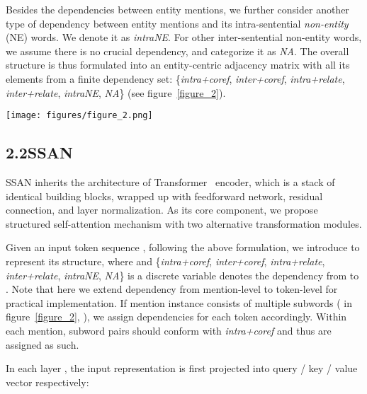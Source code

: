 \documentclass[letterpaper]{article} \usepackage{aaai21}  \usepackage{times}  \usepackage{helvet} \usepackage{courier}  \usepackage[hyphens]{url}  \usepackage{graphicx} \usepackage{booktabs}
\begin{document}
Besides the dependencies between entity mentions, we further consider another type of dependency between entity mentions and its intra-sentential \textit{non-entity} (NE) words. We denote it as \textit{intraNE}.
For other inter-sentential non-entity words, we assume there is no crucial dependency, and categorize it as \textit{NA}.
The overall structure is thus formulated into an entity-centric adjacency matrix with all its elements from a finite dependency set: \{\textit{intra+coref}, \textit{inter+coref}, \textit{intra+relate}, \textit{inter+relate}, \textit{intraNE}, \textit{NA}\} (see figure~\ref{figure_2}).


\begin{figure*}[t!]
\centering
\texttt{[image: figures/figure\_2.png]}
\caption{The overall architecture of SSAN. Left illustrates structured self-attention as its basic building block. Right explains our entity structure formulation. This minimum example consists of two sentences: , , and three entities: ,  and .  denotes non-entity tokens. Element in row  and column  represents the dependency from query token  to key token , we distinguish dependencies using different colors.}
\label{figure_2}
\end{figure*}


\subsection{2.2\quad SSAN}\label{2.2:SSAN}
SSAN inherits the architecture of Transformer~\cite{vaswani2017attention} encoder, which is a stack of identical building blocks, wrapped up with feedforward network, residual connection, and layer normalization.
As its core component, we propose structured self-attention mechanism with two alternative transformation modules.

Given an input token sequence , following the above formulation, we introduce  to represent its structure, where  and \{\textit{intra+coref}, \textit{inter+coref}, \textit{intra+relate}, \textit{inter+relate}, \textit{intraNE}, \textit{NA}\} is a discrete variable denotes the dependency from  to .
Note that here we extend dependency from mention-level to token-level for practical implementation.
If mention instance consists of multiple subwords ( in figure~\ref{figure_2}, ), we assign dependencies for each token accordingly.
Within each mention, subword pairs should conform with \textit{intra+coref} and thus are assigned as such.

In each layer , the input representation  is first projected into query / key / value vector respectively:
\end{document}
